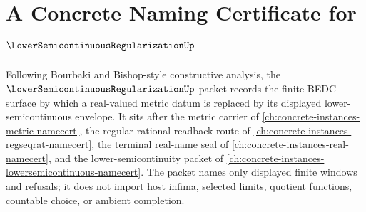 \chapter{A Concrete Naming Certificate for $\LowerSemicontinuousRegularizationUp$}
\label{ch:concrete-instances-lower-semicontinuous-regularization-namecert}

Following Bourbaki and Bishop-style constructive analysis, the $\LowerSemicontinuousRegularizationUp$ packet records the finite BEDC surface by which a real-valued metric datum is replaced by its displayed lower-semicontinuous envelope. It sits after the metric carrier of \autoref{ch:concrete-instances-metric-namecert}, the regular-rational readback route of \autoref{ch:concrete-instances-regseqrat-namecert}, the terminal real-name seal of \autoref{ch:concrete-instances-real-namecert}, and the lower-semicontinuity packet of \autoref{ch:concrete-instances-lowersemicontinuous-namecert}. The packet names only displayed finite windows and refusals; it does not import host infima, selected limits, quotient functions, countable choice, or ambient completion.

